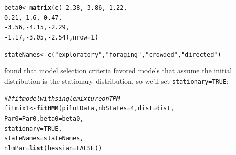 \documentclass[12pt]{article}\usepackage[]{graphicx}\usepackage[]{xcolor}
\makeatletter
\newcommand{\hlnum}[1]{\textcolor[rgb]{0.686,0.059,0.569}{#1}}%
\newcommand{\hlsng}[1]{\textcolor[rgb]{0.192,0.494,0.8}{#1}}%
\newcommand{\hlcom}[1]{\textcolor[rgb]{0.678,0.584,0.686}{\textit{#1}}}%
\newcommand{\hlopt}[1]{\textcolor[rgb]{0,0,0}{#1}}%
\newcommand{\hldef}[1]{\textcolor[rgb]{0.345,0.345,0.345}{#1}}%
\newcommand{\hlkwb}[1]{\textcolor[rgb]{0.69,0.353,0.396}{#1}}%
\newcommand{\hlkwc}[1]{\textcolor[rgb]{0.333,0.667,0.333}{#1}}%
\newcommand{\hlkwd}[1]{\textcolor[rgb]{0.737,0.353,0.396}{\textbf{#1}}}%
\newenvironment{kframe}{%
 \def\at@end@of@kframe{}%
 \ifinner\ifhmode%
  \def\at@end@of@kframe{\end{minipage}}%
  \begin{minipage}{\columnwidth}%
 \fi\fi%
 \def\FrameCommand##1{\hskip\@totalleftmargin \hskip-\fboxsep
 \colorbox{shadecolor}{##1}\hskip-\fboxsep
     \hskip-\linewidth \hskip-\@totalleftmargin \hskip\columnwidth}%
 \MakeFramed {\advance\hsize-\width
   \@totalleftmargin\z@ \linewidth\hsize
   \@setminipage}}%
 {\par\unskip\endMakeFramed%
 \at@end@of@kframe}
\newenvironment{knitrout}{}{} %
\makeatother
\begin{document}
\begin{knitrout}
\begin{kframe}
\begin{alltt}
\hldef{beta0} \hlkwb{<-} \hlkwd{matrix}\hldef{(}\hlkwd{c}\hldef{(}\hlopt{-}\hlnum{2.38}\hldef{,} \hlopt{-}\hlnum{3.86}\hldef{,} \hlopt{-}\hlnum{1.22}\hldef{,}
                   \hlnum{0.21}\hldef{,}  \hlopt{-}\hlnum{1.6}\hldef{,} \hlopt{-}\hlnum{0.47}\hldef{,}
                  \hlopt{-}\hlnum{3.56}\hldef{,} \hlopt{-}\hlnum{4.15}\hldef{,} \hlopt{-}\hlnum{2.29}\hldef{,}
                  \hlopt{-}\hlnum{1.17}\hldef{,} \hlopt{-}\hlnum{3.05}\hldef{,} \hlopt{-}\hlnum{2.54}\hldef{),}\hlkwc{nrow}\hldef{=}\hlnum{1}\hldef{)}

\hldef{stateNames} \hlkwb{<-} \hlkwd{c}\hldef{(}\hlsng{"exploratory"}\hldef{,}\hlsng{"foraging"}\hldef{,}\hlsng{"crowded"}\hldef{,}\hlsng{"directed"}\hldef{)}
\end{alltt}
\end{kframe}
\end{knitrout}
\noindent \cite{IsojunnoEtAl2017} found that model selection criteria favored models that assume the initial distribution is the stationary distribution, so we'll set \verb|stationary=TRUE|:
\begin{knitrout}
\color{fgcolor}\begin{kframe}
\begin{alltt}
\hlcom{## fit model with single mixture on TPM}
\hldef{fitmix1} \hlkwb{<-} \hlkwd{fitHMM}\hldef{(pilotData,} \hlkwc{nbStates}\hldef{=}\hlnum{4}\hldef{,} \hlkwc{dist}\hldef{=dist,}
                  \hlkwc{Par0}\hldef{=Par0,} \hlkwc{beta0}\hldef{=beta0,}
                  \hlkwc{stationary}\hldef{=}\hlnum{TRUE}\hldef{,}
                  \hlkwc{stateNames}\hldef{=stateNames,}
                  \hlkwc{nlmPar}\hldef{=}\hlkwd{list}\hldef{(}\hlkwc{hessian}\hldef{=}\hlnum{FALSE}\hldef{))}
\end{alltt}
\end{kframe}
\end{knitrout}
\end{document}
